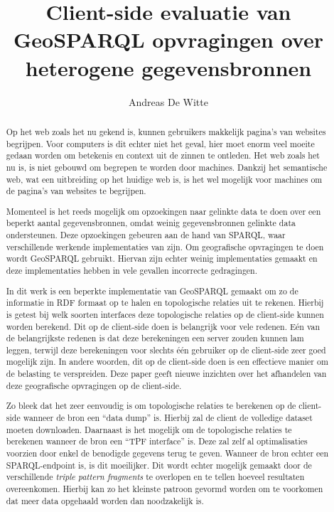 \documentclass[twocolumn]{phdsymp} %
\begin{document}
\title{Client-side evaluatie van GeoSPARQL opvragingen over heterogene gegevensbronnen} %

\author{Andreas De Witte}


\maketitle

\begin{abstract}
    Op het web zoals het nu gekend is, kunnen gebruikers makkelijk pagina's van websites begrijpen. Voor computers is dit echter niet het geval, hier moet enorm veel moeite gedaan worden om betekenis en context uit de zinnen te ontleden. Het web zoals het nu is, is niet gebouwd om begrepen te worden door machines. Dankzij het semantische web, wat een uitbreiding op het huidige web is, is het wel mogelijk voor machines om de pagina's van websites te begrijpen.
    
    Momenteel is het reeds mogelijk om opzoekingen naar gelinkte data te doen over een beperkt aantal gegevensbronnen, omdat weinig gegevensbronnen gelinkte data ondersteunen. Deze opzoekingen gebeuren aan de hand van SPARQL, waar verschillende werkende implementaties van zijn. Om geografische opvragingen te doen wordt GeoSPARQL gebruikt. Hiervan zijn echter weinig implementaties gemaakt en deze implementaties hebben in vele gevallen incorrecte gedragingen.
    
    In dit werk is een beperkte implementatie van GeoSPARQL gemaakt om zo de informatie in RDF formaat op te halen en topologische relaties uit te rekenen. Hierbij is getest bij welk soorten interfaces deze topologische relaties op de client-side kunnen worden berekend. Dit op de client-side doen is belangrijk voor vele redenen. Eén van de belangrijkste redenen is dat deze berekeningen een server zouden kunnen lam leggen, terwijl deze berekeningen voor slechts één gebruiker op de client-side zeer goed mogelijk zijn. In andere woorden, dit op de client-side doen is een effectieve manier om de belasting te verspreiden. Deze paper geeft nieuwe inzichten over het afhandelen van deze geografische opvragingen op de client-side.

    Zo bleek dat het zeer eenvoudig is om topologische relaties te berekenen op de client-side wanneer de bron een ``data dump'' is. Hierbij zal de client de volledige dataset moeten downloaden. Daarnaast is het mogelijk om de topologische relaties te berekenen wanneer de bron een ``TPF interface'' is. Deze zal zelf al optimalisaties voorzien door enkel de benodigde gegevens terug te geven. Wanneer de bron echter een SPARQL-endpoint is, is dit moeilijker. Dit wordt echter mogelijk gemaakt door de verschillende \textit{triple pattern fragments} te overlopen en te tellen hoeveel resultaten overeenkomen. Hierbij kan zo het kleinste patroon gevormd worden om te voorkomen dat meer data opgehaald worden dan noodzakelijk is.
    

\end{abstract}
\end{document}

